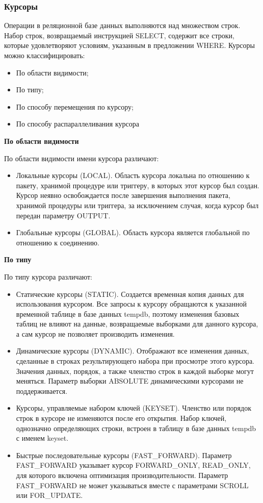 \subsubsection{Курсоры}
Операции в реляционной базе данных выполняются над множеством строк. Набор строк,
возвращаемый инструкцией SELECT, содержит все строки, которые удовлетворяют
условиям, указанным в предложении WHERE.
Курсоры можно классифицировать:
\begin{itemize}
	\item По области видимости;
	\item По типу;
	\item По способу перемещения по курсору;
	\item По способу распараллеливания курсора
\end{itemize}

\textbf{По области видимости}

По области видимости имени курсора различают:
\begin{itemize}
	\item Локальные курсоры (LOCAL). Область курсора локальна по отношению к пакету,
	хранимой процедуре или триггеру, в которых этот курсор был создан. Курсор неявно
	освобождается после завершения выполнения пакета, хранимой процедуры или триггера, за
	исключением случая, когда курсор был передан параметру OUTPUT.
	\item Глобальные курсоры (GLOBAL). Область курсора является глобальной по отношению к
	соединению.
\end{itemize}

\textbf{По типу}

По типу курсора различают:
\begin{itemize}
	\item Статические курсоры (STATIC). Создается временная копия данных для использования курсором. Все запросы к
	курсору обращаются к указанной временной таблице в базе данных tempdb, поэтому изменения базовых таблиц
	не влияют на данные, возвращаемые выборками для данного курсора, а сам курсор не позволяет производить
	изменения.
	\item Динамические курсоры (DYNAMIC). Отображают все изменения данных, сделанные в строках
	результирующего набора при просмотре этого курсора. Значения данных, порядок, а также членство строк в
	каждой выборке могут меняться. Параметр выборки ABSOLUTE динамическими курсорами не поддерживается.
	\item Курсоры, управляемые набором ключей (KEYSET). Членство или порядок строк в курсоре не изменяются после
	его открытия. Набор ключей, однозначно определяющих строки, встроен в таблицу в базе данных tempdb с
	именем keyset.
	\item Быстрые последовательные курсоры (FAST\_FORWARD). Параметр FAST\_FORWARD указывает курсор
	FORWARD\_ONLY, READ\_ONLY, для которого включена оптимизация производительности. Параметр
	FAST\_FORWARD не может указываться вместе с параметрами SCROLL или FOR\_UPDATE. 
\end{itemize}

